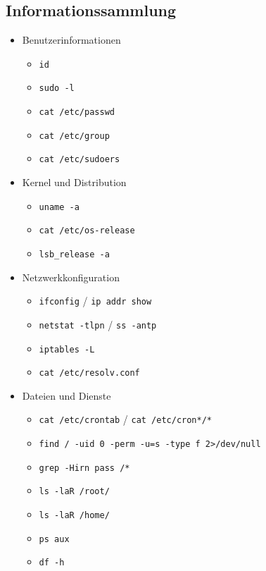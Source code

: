 \documentclass[
    parskip=half,
    landscape
]{scrartcl}
\providecommand{\tightlist}{%
   \setlength{\itemsep}{0pt}\setlength{\parskip}{0pt}}
\begin{document}

\begin{multicols}{3}
\section{Informationssammlung}
\begin{itemize}
    \tightlist
    \item Benutzerinformationen
    \begin{itemize}
        \item \texttt{id}
        \item \texttt{sudo -l}
        \item \texttt{cat /etc/passwd}
        \item \texttt{cat /etc/group}
        \item \texttt{cat /etc/sudoers}
    \end{itemize}
    \item Kernel und Distribution
    \begin{itemize}
        \item \texttt{uname -a}
        \item \texttt{cat /etc/os-release}
        \item \texttt{lsb\_release -a}
    \end{itemize}
    \item Netzwerkkonfiguration
    \begin{itemize}
        \item \texttt{ifconfig} / \texttt{ip addr show}
        \item \texttt{netstat -tlpn} / \texttt{ss -antp}
        \item \texttt{iptables -L}
        \item \texttt{cat /etc/resolv.conf}
    \end{itemize}
    \item Dateien und Dienste
    \begin{itemize}
        \item \texttt{cat /etc/crontab} / \texttt{cat /etc/cron*/*}
        \item \texttt{find / -uid 0 -perm -u=s -type f 2>/dev/null}
        \item \texttt{grep -Hirn pass /*}
        \item \texttt{ls -laR /root/}
        \item \texttt{ls -laR /home/}
        \item \texttt{ps aux}
        \item \texttt{df -h}
    \end{itemize}
\end{itemize}


\end{multicols}
\end{document}
